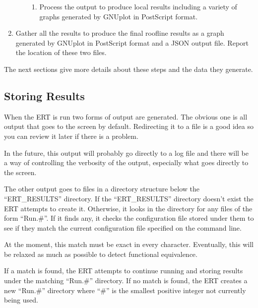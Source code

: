 \begin{enumerate}
\begin{enumerate}
\begin{enumerate}
\item{Process the output to produce local results including a variety of
graphs generated by GNUplot in PostScript format.}

\end{enumerate}

\end{enumerate}

\vspace{-0.1in}
\item{Gather all the results to produce the final roofline results as a graph
generated by GNUplot in PostScript format and a JSON output file.  Report the
location of these two files.}

\vspace{-0.1in}
\end{enumerate}

The next sections give more details about these steps and the data they
generate.

\subsection{Storing Results}

When the ERT is run two forms of output are generated.  The obvious one is
all output that goes to the screen by default.  Redirecting it to a file is a
good idea so you can review it later if there is a problem.

In the future, this output will probably go directly to a log file and there
will be a way of controlling the verbosity of the output, especially what goes
directly to the screen.

The other output goes to files in a directory structure below the
``ERT\_\+RESULTS'' directory.  If the ``ERT\_\+RESULTS'' directory doesn't
exist the ERT attempts to create it.  Otherwise, it looks in the directory
for any files of the form ``Run.\#''.  If it finds any, it checks the
configuration file stored under them to see if they match the current
configuration file specified on the command line.

At the moment, this match must be exact in every character.  Eventually, this
will be relaxed as much as possible to detect functional equivalence.

If a match is found, the ERT attempts to continue running and storing results
under the matching ``Run.\#'' directory.  If no match is found, the ERT
creates a new ``Run.\#'' directory where ``\#'' is the smallest positive
integer not currently being used.

